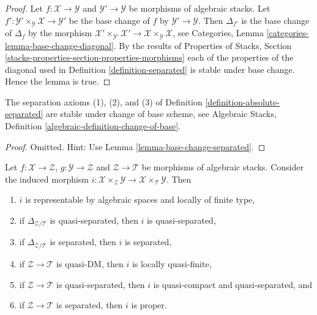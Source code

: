 \begin{proof}
Let $f : \mathcal{X} \to \mathcal{Y}$ and
$\mathcal{Y}' \to \mathcal{Y}$ be morphisms of algebraic stacks.
Let $f' : \mathcal{Y}' \times_{\mathcal{Y}} \mathcal{X} \to \mathcal{Y}'$
be the base change of $f$ by $\mathcal{Y}' \to \mathcal{Y}$.
Then $\Delta_{f'}$ is the base change of $\Delta_f$ by the morphism
$\mathcal{X}' \times_{\mathcal{Y}'} \mathcal{X}' \to
\mathcal{X} \times_{\mathcal{Y}} \mathcal{X}$, see
Categories, Lemma \ref{categories-lemma-base-change-diagonal}.
By the results of
Properties of Stacks,
Section \ref{stacks-properties-section-properties-morphisms}
each of the properties of the diagonal used in
Definition \ref{definition-separated}
is stable under base change. Hence the lemma is true.
\end{proof}

\begin{lemma}
\label{lemma-change-of-base-separated}
The separation axioms (1), (2), and (3) of
Definition \ref{definition-absolute-separated}
are stable under change of base scheme, see
Algebraic Stacks, Definition \ref{algebraic-definition-change-of-base}.
\end{lemma}

\begin{proof}
Omitted. Hint: Use
Lemma \ref{lemma-base-change-separated}.
\end{proof}

\begin{lemma}
\label{lemma-fibre-product-after-map}
Let $f : \mathcal{X} \to \mathcal{Z}$, $g : \mathcal{Y} \to \mathcal{Z}$
and $\mathcal{Z} \to \mathcal{T}$ be morphisms of algebraic stacks.
Consider the induced morphism
$i : \mathcal{X} \times_{\mathcal{Z}} \mathcal{Y} \to
\mathcal{X} \times_{\mathcal{T}} \mathcal{Y}$.
Then
\begin{enumerate}
\item $i$ is representable by algebraic spaces and locally of finite type,
\item if $\Delta_{\mathcal{Z}/\mathcal{T}}$ is quasi-separated, then
$i$ is quasi-separated,
\item if $\Delta_{\mathcal{Z}/\mathcal{T}}$ is separated, then
$i$ is separated,
\item if $\mathcal{Z} \to \mathcal{T}$ is quasi-DM,
then $i$ is locally quasi-finite,
\item if $\mathcal{Z} \to \mathcal{T}$ is quasi-separated, then
$i$ is quasi-compact and quasi-separated, and
\item if $\mathcal{Z} \to \mathcal{T}$ is separated, then $i$ is proper.
\end{enumerate}
\end{lemma}

